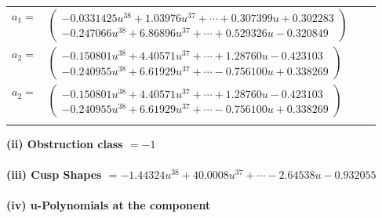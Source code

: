\documentclass[1p]{elsarticle_modified}
\theoremstyle{definition}
\begin{document}
\begin{tabular}{m{7pt} m{180pt} m{7pt} m{180pt} }
\flushright $a_{1}=$&$\begin{pmatrix}-0.0331425 u^{38}+1.03976 u^{37}+\cdots+0.307399 u+0.302283\\-0.247066 u^{38}+6.86896 u^{37}+\cdots+0.529326 u-0.320849\end{pmatrix}$ \\
\flushright $a_{2}=$&$\begin{pmatrix}-0.150801 u^{38}+4.40571 u^{37}+\cdots+1.28760 u-0.423103\\-0.240955 u^{38}+6.61929 u^{37}+\cdots-0.756100 u+0.338269\end{pmatrix}$\\ \flushright $a_{2}=$&$\begin{pmatrix}-0.150801 u^{38}+4.40571 u^{37}+\cdots+1.28760 u-0.423103\\-0.240955 u^{38}+6.61929 u^{37}+\cdots-0.756100 u+0.338269\end{pmatrix}$\\&\end{tabular}
\flushleft \textbf{(ii) Obstruction class $= -1$}\\~\\
\flushleft \textbf{(iii) Cusp Shapes $= -1.44324 u^{38}+40.0008 u^{37}+\cdots-2.64538 u-0.932055$}\\~\\
\newpage\renewcommand{\arraystretch}{1}
\flushleft \textbf{(iv) u-Polynomials at the component}\newline \\
\end{document}
